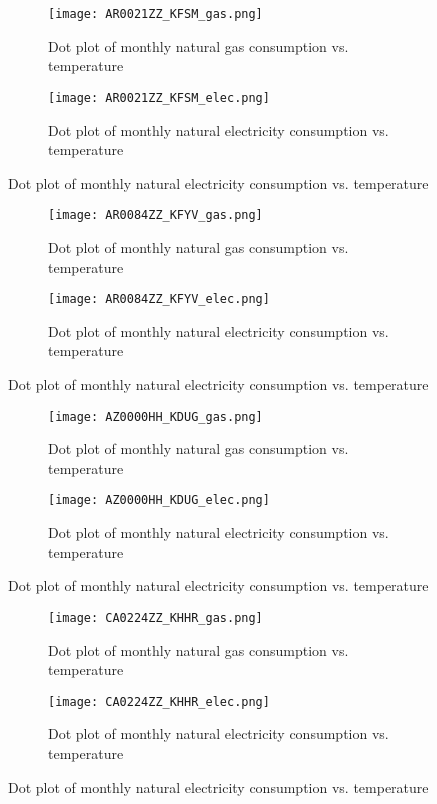 \documentclass[12pt]{article}
\begin{document}
\begin{figure}[h!]
  \centering
  \begin{subfigure}{.4\textwidth}
  \centering
  \texttt{[image: AR0021ZZ\_KFSM\_gas.png]}
  \caption{Dot plot of monthly natural gas consumption vs. temperature}
  \label{fig:AR0021ZZ_KFSM_gas}
\end{subfigure}
%
\begin{subfigure}{.4\textwidth}
  \centering
  \texttt{[image: AR0021ZZ\_KFSM\_elec.png]}
  \caption{Dot plot of monthly natural electricity consumption vs. temperature}
  \label{fig:AR0021ZZ_KFSM_elec}
\end{subfigure}
\end{figure}

\begin{figure}[h!]
  \centering
  \begin{subfigure}{.4\textwidth}
  \centering
  \texttt{[image: AR0084ZZ\_KFYV\_gas.png]}
  \caption{Dot plot of monthly natural gas consumption vs. temperature}
  \label{fig:AR0084ZZ_KFYV_gas}
\end{subfigure}
%
\begin{subfigure}{.4\textwidth}
  \centering
  \texttt{[image: AR0084ZZ\_KFYV\_elec.png]}
  \caption{Dot plot of monthly natural electricity consumption vs. temperature}
  \label{fig:AR0084ZZ_KFYV_elec}
\end{subfigure}
\end{figure}

\begin{figure}[h!]
  \centering
  \begin{subfigure}{.4\textwidth}
  \centering
  \texttt{[image: AZ0000HH\_KDUG\_gas.png]}
  \caption{Dot plot of monthly natural gas consumption vs. temperature}
  \label{fig:AZ0000HH_KDUG_gas}
\end{subfigure}
%
\begin{subfigure}{.4\textwidth}
  \centering
  \texttt{[image: AZ0000HH\_KDUG\_elec.png]}
  \caption{Dot plot of monthly natural electricity consumption vs. temperature}
  \label{fig:AZ0000HH_KDUG_elec}
\end{subfigure}
\end{figure}

\begin{figure}[h!]
  \centering
  \begin{subfigure}{.4\textwidth}
  \centering
  \texttt{[image: CA0224ZZ\_KHHR\_gas.png]}
  \caption{Dot plot of monthly natural gas consumption vs. temperature}
  \label{fig:CA0224ZZ_KHHR_gas}
\end{subfigure}
%
\begin{subfigure}{.4\textwidth}
  \centering
  \texttt{[image: CA0224ZZ\_KHHR\_elec.png]}
  \caption{Dot plot of monthly natural electricity consumption vs. temperature}
  \label{fig:CA0224ZZ_KHHR_elec}
\end{subfigure}
\end{figure}
\end{document}
